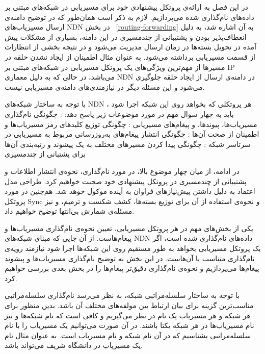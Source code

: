 

در این فصل به ارائه‌ی پروتکل پیشنهادی خود برای مسیریابی در شبکه‌های مبتنی بر داده‌های نام‌گذاری شده می‌پردازیم. لازم به ذکر است همان‌طور که در توضیح دامنه‌ی ارسال مسیریاب‌های NDN در بخش ~\ref{routing-forwarding} به آن اشاره شد، به دلیل انعطاف‌پذیر بودن و پشتیبانی از چندمسیری در این دامنه‌، بسیاری از مشکلات پیش آمده در تحویل بسته‌ها در زمان ارسال مدیریت می‌شود و در نتیجه بخشی از انتظارات از قسمت مسیریابی برداشته می‌شود. به عنوان مثال اطمینان از ایجاد نشدن حلقه در مسیرها از مهم‌ترین ویژگی‌های یک پروتکل مسیریابی در شبکه‌های مبتنی بر IP می‌باشد، در حالی که به دلیل معماری NDN در دامنه‌ی ارسال از ایجاد حلقه جلوگیری می‌شود و این مسئله دیگر در نیازمندی‌های دامنه‌ی مسیریابی نیست. 

 با توجه به ساختار شبکه‌های NDN ، هر پروتکلی که بخواهد روی این شبکه اجرا شود باید به چهار سوال مهم در مورد موضوعات زیر پاسخ دهد:
 : چگونگی نام‌گذاری مسیریاب‌ها، پیوند‌ها، و پیغام‌های مسیریابی
 : چگونگی توزیع کلید‌های رمز مسیریاب‌ها و اطمینان از صحت آن‌ها
 : چگونگی انتشار پیغام‌های به‌روزرسانی مربوط به مسیریابی در سرتاسر شبکه
 : چگونگی پیدا کردن مسیرهای مختلف به یک پیشوند و رتبه‌بندی آن‌ها برای پشتبانی از چندمسیری

در ادامه، از میان چهار موضوع بالا، در مورد نام‌گذاری، نحوه‌ی انتشار اطلاعات و پشتیبانی از چندمسیری در پروتکل پیشنهادی خود صحبت خواهیم کرد. طراحی مدل اعتماد به دلیل داشتن  پیش‌نیازهای فراوان به آینده موکول خوهد شد. هم‌چنین در مورد پروتکل Sync و نحوه‌ی استفاده از آن برای توزیع بسته‌ها، کشف شکست و ترمیم، و نیز مسئله‌ی شمارش بی‌انتها توضیح خواهیم داد.


یکی از بخش‌های مهم در هر پروتکل مسیریابی، تعیین نحوه‌ی نام‌گذاری مسیریاب‌ها و پیغام‌هاست. از آن جایی که مبنای شبکه‌های NDN داده‌های نام‌گذاری شده است، اگر یک پروتکل مسیریابی بخواهد به طور مستقیم روی این شبکه‌ها اجرا شود نیازمند رویه‌ی نام‌گذاری متناسب با آن‌هاست. در این بخش به توضیح نام‌گذاری مسیریاب‌ها و پیشوند پیغام‌ها می‌پردازیم و نحوه‌ی نام‌گذاری دقیق‌تر پیغام‌ها را در بخش بعدی بررسی خواهیم کرد. 

با توجه به ساختار سلسله‌مراتبی شبکه، به نظر می‌رسد نام‌گذاری سلسله‌مراتبی مناسب‌ترین گزینه برای بیان ارتباط بین مولفه‌های مختلف آن باشد. بدین منظور برای هر شبکه و هر مسیریاب یک نام در نظر می‌گیریم و کافی است که نام شبکه‌ها و نیز نام مسیریاب‌ها در هر شبکه یکتا باشند. در آن صورت می‌توانیم یک مسیریاب را با نام سلسله‌مراتبی  بشناسیم که در آن  نام شبکه و  نام مسیریاب است. به عنوان مثال نام یک مسیریاب در دانشگاه شریف می‌تواند  باشد. 

